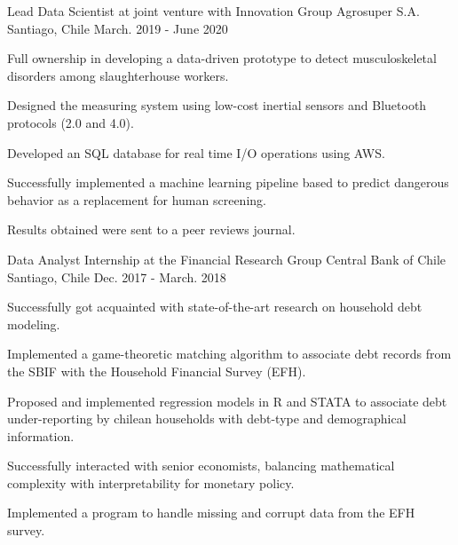 

\begin{cventries}


\cventry
{Lead Data Scientist at joint venture with Innovation Group} %
{Agrosuper S.A.} %
{Santiago, Chile} %
{March. 2019 - June 2020} %
{
  \begin{cvitems} %
    \item {Full ownership in developing a data-driven prototype to detect musculoskeletal disorders among slaughterhouse workers.}
    \item {Designed the measuring system using low-cost inertial sensors and Bluetooth protocols (2.0 and 4.0).}
    \item {Developed an SQL database for real time I/O operations using AWS.}
    \item {Successfully implemented a machine learning pipeline based to predict dangerous behavior as a replacement for human screening.}
    \item {Results obtained were sent to a peer reviews journal.}
  \end{cvitems}
}


  \cventry
    {Data Analyst Internship at the Financial Research Group} %
    {Central Bank of Chile} %
    {Santiago, Chile} %
    {Dec. 2017 - March. 2018} %
    {
      \begin{cvitems} %
        \item {Successfully got acquainted with state-of-the-art research on household debt modeling.}
        \item {Implemented a game-theoretic matching algorithm to associate debt records from the SBIF with the Household Financial Survey (EFH).}
        \item {Proposed and implemented regression models in R and STATA to associate debt under-reporting by chilean households with debt-type and demographical information.}
        \item {Successfully interacted with senior economists, balancing mathematical complexity with interpretability for monetary policy.}
        \item {Implemented a program to handle missing and corrupt data from the EFH survey.}
      \end{cvitems}
    }
\end{cventries}
